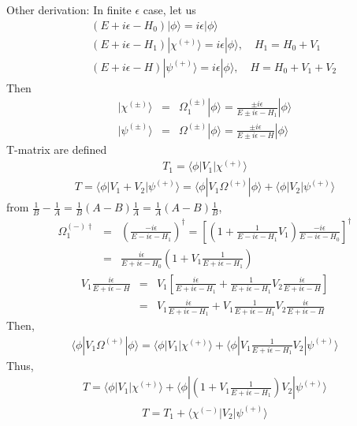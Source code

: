 \documentclass[10pt]{book}
\newcommand{\bea}{\begin{eqnarray}}
\newcommand{\eea}{\end{eqnarray}}
\newcommand{\no}{\nonumber \\}
\def\la{\langle}
\def\ra{\rangle}
\begin{document}
Other derivation:
In finite $\epsilon$ case, let us 
\bea 
& &(E+i\epsilon-H_0)|\phi\ra =i\epsilon|\phi\ra \no 
& &(E+i\epsilon-H_1)|\chi^{(+)}\ra =i\epsilon|\phi\ra,\quad H_1=H_0+V_1 \no 
& &(E+i\epsilon-H)|\psi^{(+)}\ra =i\epsilon|\phi\ra,\quad H=H_0+V_1+V_2
\eea 
Then 
\bea 
|\chi^{(\pm)}\ra&=&\Omega^{(\pm)}_1|\phi\ra =\frac{\pm i\epsilon}{E\pm i\epsilon -H_1}|\phi\ra  \no 
|\psi^{(\pm)}\ra&=&\Omega^{(\pm)}|\phi\ra =\frac{\pm i\epsilon}{E\pm i\epsilon -H}|\phi\ra  
\eea 
T-matrix are defined
\bea 
T_1=\la \phi|V_1|\chi^{(+)}\ra 
\eea 
\bea 
T=\la \phi|V_1+V_2|\psi^{(+)}\ra=\la \phi|V_1\Omega^{(+)}|\phi \ra +\la \phi|V_2|\psi^{(+)}\ra   
\eea 
from $\frac{1}{B}-\frac{1}{A}=\frac{1}{B}(A-B)\frac{1}{A}=\frac{1}{A}(A-B)\frac{1}{B}$,
\bea 
\Omega_1^{(-)\dagger}&=&\left(\frac{-i\epsilon}{E-i\epsilon-H_1}\right)^\dagger=
    \left[\left(1+\frac{1}{E-i\epsilon-H_1} V_1 \right)
   \frac{-i\epsilon}{E-i\epsilon-H_0}\right]^\dagger   \no 
&=& \frac{i\epsilon}{E+i\epsilon-H_0}\left(1+V_1 \frac{1}{E+i\epsilon-H_1}  \right)          
\eea 
\bea 
V_1\frac{i\epsilon}{E+i\epsilon-H}
&=&V_1\left[\frac{i\epsilon}{E+i\epsilon-H_1}
 +\frac{1}{E+i\epsilon-H_1}V_2\frac{i\epsilon}{E+i\epsilon-H}   \right] \no 
&=&V_1\frac{i\epsilon}{E+i\epsilon-H_1}+V_1\frac{1}{E+i\epsilon-H_1}V_2\frac{i\epsilon}{E+i\epsilon-H} 
\eea 
Then,
\bea 
\la \phi|V_1\Omega^{(+)}|\phi\ra 
=\la \phi|V_1|\chi^{(+)}\ra 
 +\la \phi|V_1\frac{1}{E+i\epsilon-H_1}V_2|\psi^{(+)}\ra 
\eea 
Thus, 
\bea 
T=\la \phi|V_1|\chi^{(+)}\ra
  +\la \phi|\left(1+V_1\frac{1}{E+i\epsilon-H_1}\right)V_2|\psi^{(+)}\ra   
\eea 
\bea 
T=T_1+\la \chi^{(-)}|V_2|\psi^{(+)}\ra
\eea 
\end{document}
